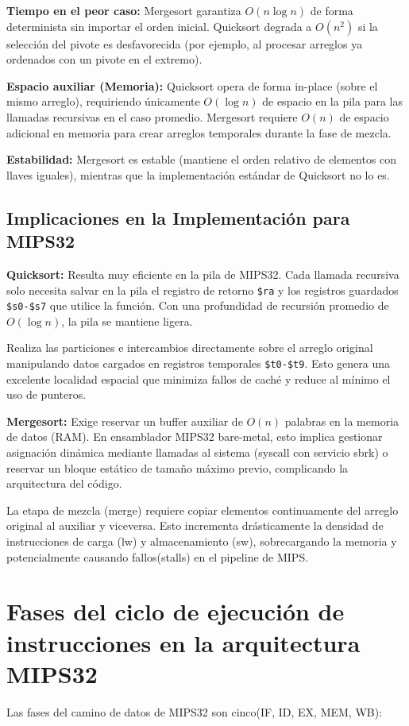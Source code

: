 \documentclass[12pt, a4paper]{article}
\begin{document}
            \textbf{Tiempo en el peor caso:} Mergesort garantiza $O(n \log n)$ de forma determinista sin importar el orden inicial. Quicksort degrada a $O(n^2)$ si la selección del pivote es desfavorecida (por ejemplo, al procesar arreglos ya ordenados con un pivote en el extremo).
            
            \textbf{Espacio auxiliar (Memoria):} Quicksort opera de forma in-place (sobre el mismo arreglo), requiriendo únicamente $O(\log n)$ de espacio en la pila para las llamadas recursivas en el caso promedio. Mergesort requiere $O(n)$ de espacio adicional en memoria para crear arreglos temporales durante la fase de mezcla.
            
            \textbf{Estabilidad:} Mergesort es estable (mantiene el orden relativo de elementos con llaves iguales), mientras que la implementación estándar de Quicksort no lo es.
        \subsection{Implicaciones en la Implementación para MIPS32}
            \textbf{Quicksort:} Resulta muy eficiente en la pila de MIPS32. Cada llamada recursiva solo necesita salvar en la pila el registro de retorno \lstinline|$ra| y los registros guardados \lstinline|$s0-$s7| que utilice la función. Con una profundidad de recursión promedio de $O(\log n)$, la pila se mantiene ligera.

            Realiza las particiones e intercambios directamente sobre el arreglo original manipulando datos cargados en registros temporales \lstinline|$t0-$t9|. Esto genera una excelente localidad espacial que minimiza fallos de caché y reduce al mínimo el uso de punteros.
            
            \textbf{Mergesort:} Exige reservar un buffer auxiliar de $O(n)$ palabras en la memoria de datos (RAM). En ensamblador MIPS32 bare-metal, esto implica gestionar asignación dinámica mediante llamadas al sistema (syscall con servicio sbrk) o reservar un bloque estático de tamaño máximo previo, complicando la arquitectura del código.

            La etapa de mezcla (merge) requiere copiar elementos continuamente del arreglo original al auxiliar y viceversa. Esto incrementa drásticamente la densidad de instrucciones de carga (lw) y almacenamiento (sw), sobrecargando la memoria y potencialmente causando fallos(stalls) en el pipeline de MIPS.
    \section{Fases del ciclo de ejecución de instrucciones en la arquitectura MIPS32}
        Las fases del camino de datos de MIPS32 son cinco(IF, ID, EX, MEM, WB):
        
\end{document}
